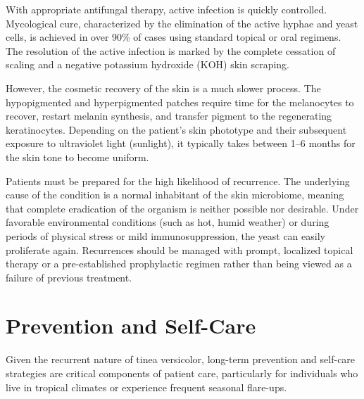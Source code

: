 With appropriate antifungal therapy, active infection is quickly controlled. Mycological cure, characterized by the elimination of the active hyphae and yeast cells, is achieved in over 90\% of cases using standard topical or oral regimens. The resolution of the active infection is marked by the complete cessation of scaling and a negative potassium hydroxide (KOH) skin scraping.

However, the cosmetic recovery of the skin is a much slower process. The hypopigmented and hyperpigmented patches require time for the melanocytes to recover, restart melanin synthesis, and transfer pigment to the regenerating keratinocytes. Depending on the patient's skin phototype and their subsequent exposure to ultraviolet light (sunlight), it typically takes between 1--6 months for the skin tone to become uniform.

Patients must be prepared for the high likelihood of recurrence. The underlying cause of the condition is a normal inhabitant of the skin microbiome, meaning that complete eradication of the organism is neither possible nor desirable. Under favorable environmental conditions (such as hot, humid weather) or during periods of physical stress or mild immunosuppression, the yeast can easily proliferate again. Recurrences should be managed with prompt, localized topical therapy or a pre-established prophylactic regimen rather than being viewed as a failure of previous treatment.

\section*{Prevention and Self-Care}
Given the recurrent nature of tinea versicolor, long-term prevention and self-care strategies are critical components of patient care, particularly for individuals who live in tropical climates or experience frequent seasonal flare-ups.

